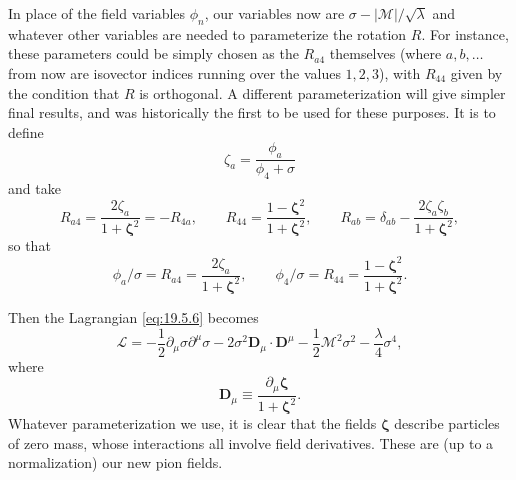 In place of the field variables $\phi_n$, our variables now are $\sigma-|\mathcal M|/\sqrt{\lambda}$ and whatever other variables are needed to parameterize the rotation $R$. For instance, these parameters could be simply chosen as the $R_{a4}$ themselves (where $a,b,\ldots$ from now are isovector indices running over the values $1,2,3$), with $R_{44}$ given by the condition that $R$ is orthogonal. A different parameterization will give simpler final results, and was historically the first to be used for these purposes. It is to define
\begin{equation}
\zeta_a=\frac{\phi_a}{\phi_4+\sigma}
\tag{19.5.7}\label{eq:19.5.7}
\end{equation}
and take
\begin{equation}
R_{a4}=\frac{2\zeta_a}{1+\boldsymbol{\zeta}^2}=-R_{4a},
\qquad
R_{44}=\frac{1-\boldsymbol{\zeta}^2}{1+\boldsymbol{\zeta}^2},
\qquad
R_{ab}=\delta_{ab}-\frac{2\zeta_a\zeta_b}{1+\boldsymbol{\zeta}^2},
\tag{19.5.8}\label{eq:19.5.8}
\end{equation}
so that
\begin{equation}
\phi_a/\sigma=R_{a4}=\frac{2\zeta_a}{1+\boldsymbol{\zeta}^2},
\qquad
\phi_4/\sigma=R_{44}=\frac{1-\boldsymbol{\zeta}^2}{1+\boldsymbol{\zeta}^2}.
\tag{19.5.9}\label{eq:19.5.9}
\end{equation}

Then the Lagrangian \eqref{eq:19.5.6} becomes
\begin{equation}
\mathcal L
=-\frac{1}{2}\partial_\mu\sigma\partial^\mu\sigma
-2\sigma^2\boldsymbol D_\mu\cdot\boldsymbol D^\mu
-\frac{1}{2}\mathcal M^2\sigma^2-\frac{\lambda}{4}\sigma^4,
\tag{19.5.10}\label{eq:19.5.10}
\end{equation}
where
\begin{equation}
\boldsymbol D_\mu\equiv
\frac{\partial_\mu\boldsymbol{\zeta}}{1+\boldsymbol{\zeta}^2}.
\tag{19.5.11}\label{eq:19.5.11}
\end{equation}
Whatever parameterization we use, it is clear that the fields $\boldsymbol{\zeta}$ describe particles of zero mass, whose interactions all involve field derivatives. These are (up to a normalization) our new pion fields.

